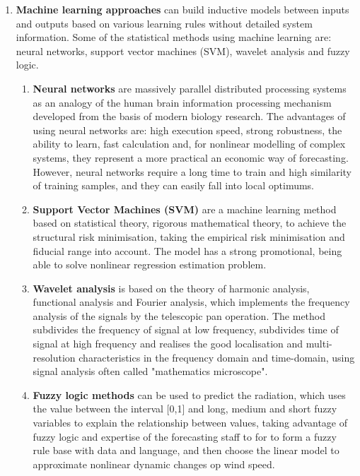 \begin{enumerate}
    \item \textbf{Machine learning approaches} can build inductive models between inputs and outputs based on various learning rules without detailed system information. Some of the statistical methods using machine learning are: neural networks, support vector machines (SVM), wavelet analysis and fuzzy logic.
    \begin{enumerate}
        \item \textbf{Neural networks} are massively parallel distributed processing systems as an analogy of the human brain information processing mechanism developed from the basis of modern biology research. The advantages of using neural networks are: high execution speed, strong robustness, the ability to learn, fast calculation and, for nonlinear modelling of complex systems, they represent a more practical an economic way of forecasting. However, neural networks require a long time to train and high similarity of training samples, and they can easily fall into local optimums.
        \item \textbf{Support Vector Machines (SVM)} are a machine learning method based on statistical theory, rigorous mathematical theory, to achieve the structural risk minimisation, taking the empirical risk minimisation and fiducial range into account. The model has a strong promotional, being able to solve nonlinear regression estimation problem.
        \item \textbf{Wavelet analysis} is based on the theory of harmonic analysis, functional analysis and Fourier analysis, which implements the frequency analysis of the signals by the telescopic pan operation. The method subdivides the frequency of signal at low frequency, subdivides time of signal at high frequency and realises the good localisation and multi-resolution characteristics in the frequency domain and time-domain, using signal analysis often called "mathematics microscope".
        \item \textbf{Fuzzy logic methods} can be used to predict the radiation, which uses the value between the interval [0,1] and long, medium and short fuzzy variables to explain the relationship between values, taking advantage of fuzzy logic and expertise of the forecasting staff to for  to form a fuzzy rule base with data and language, and then choose the linear model to approximate nonlinear dynamic changes op wind speed.
    \end{enumerate}
    
\end{enumerate}

